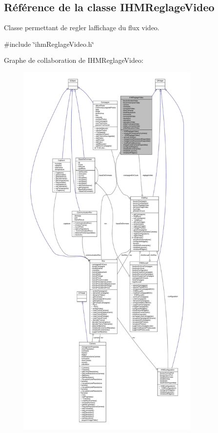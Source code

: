 \hypertarget{class_i_h_m_reglage_video}{}\subsection{Référence de la classe I\+H\+M\+Reglage\+Video}
\label{class_i_h_m_reglage_video}


Classe permettant de regler l\textquotesingle{}affichage du flux video.  




{\ttfamily \#include \char`\"{}ihm\+Reglage\+Video.\+h\char`\"{}}



Graphe de collaboration de I\+H\+M\+Reglage\+Video\+:
\nopagebreak
\begin{figure}[H]
\begin{center}
\leavevmode
\includegraphics[height=550pt]{class_i_h_m_reglage_video__coll__graph}
\end{center}
\end{figure}
